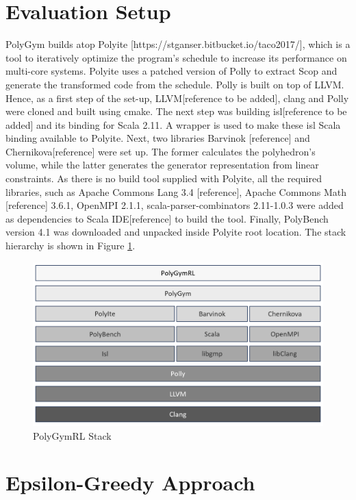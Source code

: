 \documentclass[logo,msc]{infthesis}           %
\begin{document}
\section{Evaluation Setup}

PolyGym builds atop Polyite [https://stganser.bitbucket.io/taco2017/], which is a tool to iteratively optimize the program's schedule to increase its performance on multi-core systems. Polyite uses a patched version of Polly to extract Scop and generate the transformed code from the schedule. Polly is built on top of LLVM. Hence, as a first step of the set-up, LLVM[reference to be added], clang and Polly were cloned and built using cmake. The next step was building isl[reference to be added] and its binding for Scala 2.11. A wrapper is used to make these isl Scala binding available to Polyite. Next, two libraries Barvinok [reference] and Chernikova[reference] were set up. The former calculates the polyhedron's volume, while the latter generates the generator representation from linear constraints. As there is no build tool supplied with Polyite, all the required libraries, such as Apache Commons Lang 3.4 [reference], Apache Commons Math [reference] 3.6.1, OpenMPI 2.1.1, scala-parser-combinators 2.11-1.0.3 were added as dependencies to Scala IDE[reference] to build the tool. Finally, PolyBench version 4.1 was downloaded and unpacked inside Polyite root location. The stack hierarchy is shown in Figure \ref{fig::stack}.

\begin{figure}[htbp]  
  \centering
  \includegraphics[width=\textwidth]{Images/PolyGymRlStack.png}    
  \caption{PolyGymRL Stack}
  \label{fig::stack}
\end{figure}

\section{Epsilon-Greedy Approach}
\end{document}
